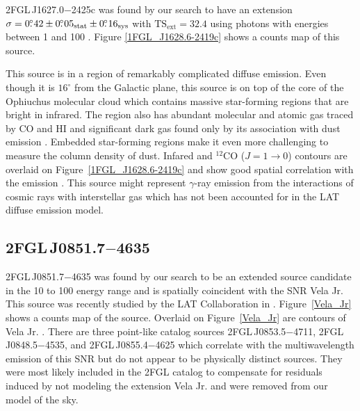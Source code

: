 \documentclass[12pt,preprint]{aastex}
\newcommand{\gev}{\text{GeV}\xspace}
\newcommand{\tev}{\text{TeV}\xspace}
\newcommand{\tsext}{{\ensuremath{\text{TS}_{\text{ext}}}}\xspace}
\newcommand{\sys}{\text{sys}\xspace}
\newcommand{\stat}{\text{stat}\xspace}
\newcommand{\degree}{^\circ\xspace}
\begin{document}

2FGL\,J1627.0$-$2425c was found by our search to
have an extension $\sigma=0\fdg42\pm0\fdg05_\stat\pm0\fdg16_\sys$ with
$\tsext=32.4$
using photons with energies between 1 \gev and 100 \gev.  
Figure \ref{1FGL_J1628.6-2419c} shows a counts map of this source.

This source is in a region of remarkably complicated diffuse emission.
Even though it is $16\degree$ from the Galactic plane, this source is on
top of the core of the Ophiuchus molecular cloud which contains massive
star-forming regions that are bright in infrared.  The region also has
abundant molecular and atomic gas traced by CO and HI and significant 
dark gas found only by its association with dust emission
\citep{isabelle_dark_gass}. Embedded star-forming regions make it even
more challenging to measure the column density of dust.  Infared and 
${}^{12}\text{CO}$ ($J=1\rightarrow 0$)
contours are overlaid on Figure~\ref{1FGL_J1628.6-2419c} and show good
spatial correlation with the \gev emission \citep{iras_rho_ophiuci,co_rho_ophiuci}.
This source might 
represent $\gamma$-ray emission from the interactions of cosmic rays with
interstellar gas which has not been accounted for in the LAT diffuse
emission model.


\subsection{2FGL\,J0851.7$-$4635}
\label{section_2FGL_J0851.7-4635}


2FGL\,J0851.7$-$4635 was found by our search to be an extended source
candidate in the 10 \gev to 100 \gev energy range and is spatially
coincident with the SNR Vela Jr. This source was recently studied by the LAT
Collaboration in \cite{vela_jr_lat}.  Figure~\ref{Vela_Jr} shows a counts
map of the source.  Overlaid on Figure~\ref{Vela_Jr} are \tev
contours of Vela Jr. \citep{vela_jr_hess}.
There are three
point-like catalog sources 2FGL\,J0853.5$-$4711, 2FGL\,J0848.5$-$4535,
and 2FGL\,J0855.4$-$4625 which correlate with the 
multiwavelength
emission of
this SNR but do not appear to be physically distinct sources.
They were most likely included in the 2FGL catalog to compensate for residuals
induced by not modeling the extension Vela Jr. and were removed
from our model of the sky.  
\end{document}
